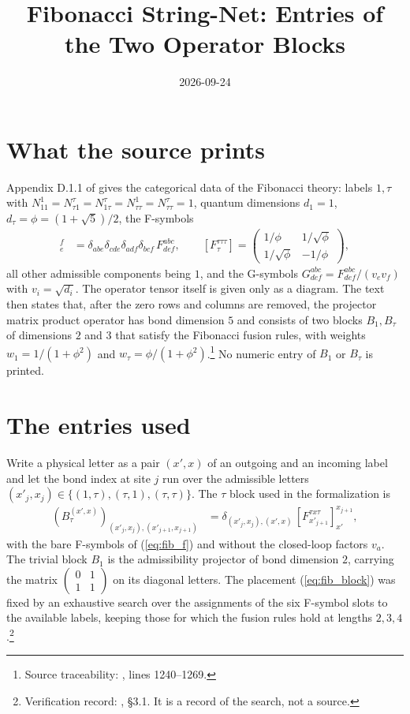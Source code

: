 \documentclass{article}
\title{Fibonacci String-Net: Entries of the Two Operator Blocks}
\author{}
\date{2026-09-24}
\begin{document}
\maketitle
{}

\section{What the source prints}
Appendix D.1.1 of \cite{Bultinck2017Anyons} gives the categorical data of the
Fibonacci theory: labels $1,\tau$ with
$N_{11}^1=N_{\tau1}^\tau=N_{1\tau}^\tau=N_{\tau\tau}^1=N_{\tau\tau}^\tau=1$,
quantum dimensions $d_1=1$, $d_\tau=\phi=(1+\sqrt5)/2$, the F-symbols
\begin{align}
    [F^{abc}_d]_e^f & =\delta_{abe}\delta_{cde}\delta_{adf}\delta_{bcf}\,F^{abc}_{def},
    \qquad
    [F^{\tau\tau\tau}_\tau]
    =\begin{pmatrix}1/\phi & 1/\sqrt\phi\\ 1/\sqrt\phi & -1/\phi\end{pmatrix},
    \label{eq:fib_f}
\end{align}
all other admissible components being $1$, and the G-symbols
$G^{abc}_{def}=F^{abc}_{def}/(v_ev_f)$ with $v_i=\sqrt{d_i}$. The operator
tensor itself is given only as a diagram. The text then states that, after the
zero rows and columns are removed, the projector matrix product operator has
bond dimension $5$ and consists of two blocks $B_1,B_\tau$ of dimensions $2$
and $3$ that satisfy the Fibonacci fusion rules, with weights
$w_1=1/(1+\phi^2)$ and $w_\tau=\phi/(1+\phi^2)$.\footnote{Source traceability:
    , lines 1240--1269.}
No numeric entry of $B_1$ or $B_\tau$ is printed.

\section{The entries used}
Write a physical letter as a pair $(x',x)$ of an outgoing and an incoming label
and let the bond index at site $j$ run over the admissible letters
$(x'_j,x_j)\in\{(1,\tau),(\tau,1),(\tau,\tau)\}$. The $\tau$ block used in the
formalization is
\begin{align}
    (B_\tau^{(x',x)})_{(x'_j,x_j),(x'_{j+1},x_{j+1})}
     & =\delta_{(x'_j,x_j),(x',x)}\,
    [F^{\tau x\tau}_{x'_{j+1}}]_{x'}^{x_{j+1}},
    \label{eq:fib_block}
\end{align}
with the bare F-symbols of (\ref{eq:fib_f}) and without the closed-loop factors
$v_a$. The trivial block $B_1$ is the admissibility projector of bond
dimension $2$, carrying the matrix $\begin{pmatrix}0&1\\1&1\end{pmatrix}$ on its
diagonal letters. The placement (\ref{eq:fib_block}) was fixed by an
exhaustive search over the assignments of the six F-symbol slots to the
available labels, keeping those for which the fusion rules hold at lengths
$2,3,4$.\footnote{Verification record:
    , \S3.1. It is
    a record of the search, not a source.}
\end{document}
